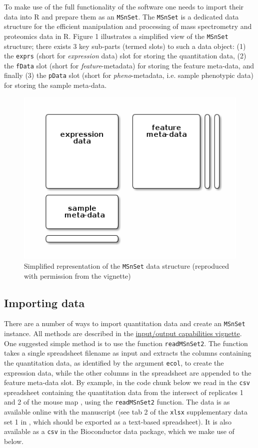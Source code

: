 To make use of the full functionality of the  software
one needs to import their data into R and prepare them as an
\texttt{MSnSet}. The \texttt{MSnSet} is a dedicated data structure for
the efficient manipulation and processing of mass spectrometry and
proteomics data in R. Figure 1 illustrates a simplified view of the
\texttt{MSnSet} structure; there exists 3 key sub-parts (termed slots)
to such a data object: (1) the \texttt{exprs} (short for
\textit{expression} data) slot for storing the quantitation data, (2)
the \texttt{fData} slot (short for \textit{feature}-metadata) for
storing the feature meta-data, and finally (3) the \texttt{pData} slot
(short for \textit{pheno}-metadata, i.e. sample phenotypic data) for
storing the sample meta-data.

\begin{figure}[!ht]
  \centering
  \includegraphics[width=.5\textwidth]{./Figures/msnset.png}
  \caption{Simplified representation of the \texttt{MSnSet} data
    structure (reproduced with permission from the 
    vignette)}
  \label{fig:msnset}
\end{figure}

\subsection*{Importing data}

There are a number of ways to import quantitation data and create an
\texttt{MSnSet} instance. All methods are described in the
\href{http://bioconductor.org/packages/release/bioc/vignettes/MSnbase/inst/doc/MSnbase-io.pdf}{input/output
  capabilities vignette}. One suggested simple method is to use the
function \texttt{readMSnSet2}. The function takes a single spreadsheet
filename as input and extracts the columns containing the quantitation
data, as identified by the argument \texttt{ecol}, to create the
expression data, while the other columns in the spreadsheet are
appended to the feature meta-data slot.  By example, in the code chunk
below we read in the \texttt{csv} spreadsheet containing the
quantitation data from the intersect of replicates 1 and 2 of the
mouse map \cite{hyper}, using the \texttt{readMSnSet2} function. The
data is as available online with the manuscript (see tab 2 of the
\texttt{xlsx} supplementary data set 1 in \cite{hyper}, which should
be exported as a text-based spreadsheet). It is also available as a
\texttt{csv} in the Bioconductor  data
package, which we make use of below.

